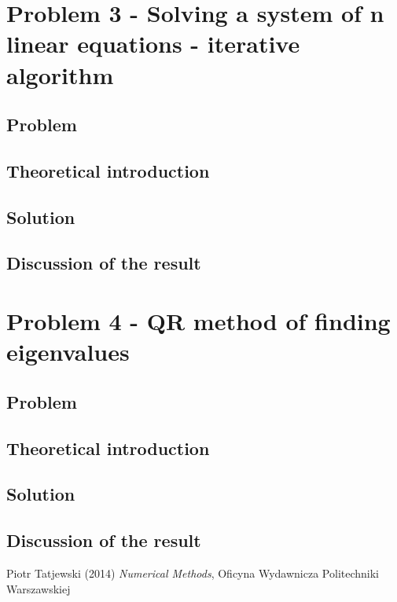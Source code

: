 \documentclass{report}
\begin{document}
\chapter{Problem 3 - Solving a system of n linear equations - iterative algorithm}

\section{Problem}

\section{Theoretical introduction}

\section{Solution}

\section{Discussion of the result}
\chapter{Problem 4 - QR method of finding eigenvalues}

\section{Problem}

\section{Theoretical introduction}

\section{Solution}

\section{Discussion of the result}

\begin{thebibliography}{9}
Piotr Tatjewski (2014) \emph{Numerical Methods}, Oficyna Wydawnicza Politechniki Warszawskiej
\end{thebibliography}
\end{document}
